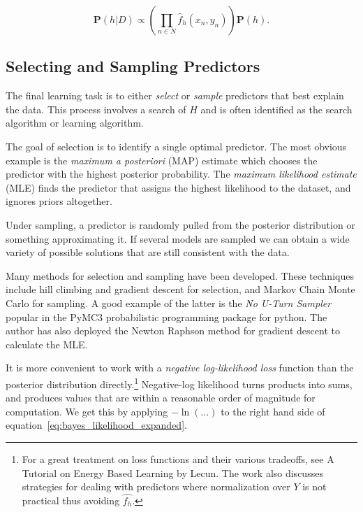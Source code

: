 \documentclass[twoside]{article}
\begin{document}
\begin{equation}
\label{eq:bayes_likelihood_expanded}
\mathbf{P}(h|D)\propto \left( \prod_{n \in N} \hat{f}_h(x_n,y_n) \right) \mathbf{P}(h).
\end{equation}

\subsection{Selecting and Sampling Predictors}

The final learning task is to either \textit{select} or \textit{sample} predictors that best explain the data. This process involves a search of \(H\) and is often identified as the search algorithm or learning algorithm.

The goal of selection is to identify a single optimal predictor. The most obvious example is the \textit{maximum a posteriori} (MAP) estimate which chooses the predictor with the highest posterior probability. The \textit{maximum likelihood estimate} (MLE) finds the predictor that assigns the highest likelihood to the dataset, and ignores priors altogether.

Under sampling, a predictor is randomly pulled from the posterior distribution or something approximating it. If several models are sampled we can obtain a wide variety of possible solutions that are still consistent with the data.

Many methods for selection and sampling have been developed. These techniques include hill climbing and gradient descent for selection, and Markov Chain Monte Carlo for sampling. A good example of the latter is the \textit{No U-Turn Sampler}\cite{gelman} popular in the PyMC3\cite{pymc3} probabilistic programming package for python. The author has also deployed the Newton Raphson method for gradient descent to calculate the MLE.\cite{sklar_dirichlet}

It is more convenient to work with a \textit{negative log-likelihood loss} function than the posterior distribution directly.\footnote{For a great treatment on loss functions and their various tradeoffs, see A Tutorial on Energy Based Learning by Lecun\cite{lecun}. The work also discusses strategies for dealing with predictors where normalization over \(Y\) is not practical thus avoiding \(\hat{f_h}\).} Negative-log likelihood turns products into sums, and produces values that are within a reasonable order of magnitude for computation. We get this by applying \(-\ln(\ldots)\) to the right hand side of equation~\eqref{eq:bayes_likelihood_expanded}.
\end{document}

